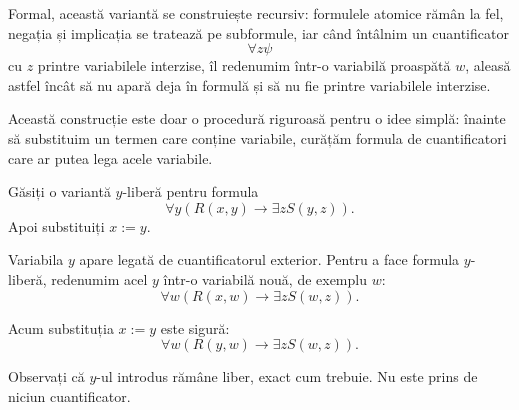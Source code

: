 Formal, această variantă se construiește recursiv: formulele atomice rămân la fel, negația și implicația se tratează pe subformule, iar când întâlnim un cuantificator
\[
	\forall z \psi
\]
cu \(z\) printre variabilele interzise, îl redenumim într-o variabilă proaspătă \(w\), aleasă astfel încât să nu apară deja în formulă și să nu fie printre variabilele interzise.

\begin{note}
	Această construcție este doar o procedură riguroasă pentru o idee simplă: înainte să substituim un termen care conține variabile, curățăm formula de cuantificatori care ar putea lega acele variabile.
\end{note}

\begin{ex}
	Găsiți o variantă \(y\)-liberă pentru formula
	\[
		\forall y(R(x,y) \to \exists z S(y,z)).
	\]
	Apoi substituiți \(x:=y\).
\end{ex}

\begin{solutie}
	Variabila \(y\) apare legată de cuantificatorul exterior. Pentru a face formula \(y\)-liberă, redenumim acel \(y\) într-o variabilă nouă, de exemplu \(w\):
	\[
		\forall w(R(x,w) \to \exists z S(w,z)).
	\]

	Acum substituția \(x:=y\) este sigură:
	\[
		\forall w(R(y,w) \to \exists z S(w,z)).
	\]

	Observați că \(y\)-ul introdus rămâne liber, exact cum trebuie. Nu este prins de niciun cuantificator.
\end{solutie}
